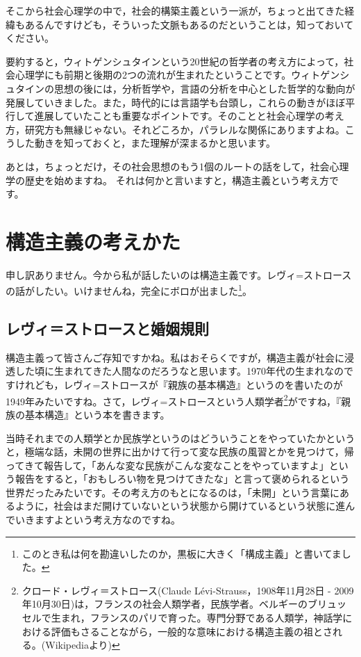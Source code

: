 \documentclass{ltjsbook}
\begin{document}
そこから社会心理学の中で，社会的構築主義という一派が，ちょっと出てきた経緯もあるんですけども，そういった文脈もあるのだということは，知っておいてください。

要約すると，ウィトゲンシュタインという20世紀の哲学者の考え方によって，社会心理学にも前期と後期の2つの流れが生まれたということです。ウィトゲンシュタインの思想の後には，分析哲学や，言語の分析を中心とした哲学的な動向が発展していきました。また，時代的には言語学も台頭し，これらの動きがほぼ平行して進展していたことも重要なポイントです。そのことと社会心理学の考え方，研究方も無縁じゃない。それどころか，パラレルな関係にありますよね。こうした動きを知っておくと，また理解が深まるかと思います。

あとは，ちょっとだけ，その社会思想のもう1個のルートの話をして，社会心理学の歴史を始めますね。
それは何かと言いますと，構造主義という考え方です。

\section{構造主義の考えかた}
申し訳ありません。今から私が話したいのは構造主義です。レヴィ=ストロースの話がしたい。いけませんね，完全にボロが出ました\footnote{このとき私は何を勘違いしたのか，黒板に大きく「構成主義」と書いてました。}。
\subsection{レヴィ＝ストロースと婚姻規則}
構造主義って皆さんご存知ですかね。私はおそらくですが，構造主義が社会に浸透した頃に生まれてきた人間なのだろうなと思います。1970年代の生まれなのですけれども，レヴィ=ストロースが『親族の基本構造』というのを書いたのが1949年みたいですね。さて，レヴィ=ストロースという人類学者\footnote{クロード・レヴィ＝ストロース(Claude L\'{e}vi-Strauss，1908年11月28日 - 2009年10月30日)は，フランスの社会人類学者，民族学者。ベルギーのブリュッセルで生まれ，フランスのパリで育った。専門分野である人類学，神話学における評価もさることながら，一般的な意味における構造主義の祖とされる。(Wikipediaより)}がですね，『親族の基本構造』という本を書きます。

当時それまでの人類学とか民族学というのはどういうことをやっていたかというと，極端な話，未開の世界に出かけて行って変な民族の風習とかを見つけて，帰ってきて報告して，「あんな変な民族がこんな変なことをやっていますよ」という報告をすると，「おもしろい物を見つけてきたな」と言って褒められるという世界だったみたいです。その考え方のもとになるのは，「未開」という言葉にあるように，社会はまだ開けていないという状態から開けているという状態に進んでいきますよという考え方なのですね。
\end{document}
